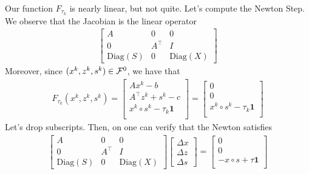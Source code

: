 	Our function $F_{\tau_k}$ is nearly linear, but not quite. Let's compute the Newton Step. We observe that the Jacobian is the linear operator
	\begin{eqnarray*}
	\begin{bmatrix}
	A & 0 & 0 \\
	0 & A^\top & I \\
	\mathrm{Diag}(S) & 0 & \mathrm{Diag}(X)
	\end{bmatrix}
	\end{eqnarray*}
	Moreover, since $(x^k,z^k,s^k) \in {\cal F}^0$, we have that
	\begin{eqnarray*}
	F_{\tau_k}(x^k,z^k,s^k) = \begin{bmatrix} Ax^k - b \\
		A^\top z^k + s^k - c \\
		x^k \circ s^k - \tau_{k} \mathbf{1} \\
		\end{bmatrix} = \begin{bmatrix} 0 \\
		0 \\
		x^k \circ s^k - \tau_{k} \mathbf{1} \\
		\end{bmatrix}
	\end{eqnarray*}
	Let's drop subscripts. Then, on one can verify that the Newton satisfies
	\begin{eqnarray*}
	\begin{bmatrix}
	A & 0 & 0 \\
	0 & A^\top & I \\
	\mathrm{Diag}(S) & 0 & \mathrm{Diag}(X)
	\end{bmatrix} \begin{bmatrix} \Delta x\\
	\Delta z\\
	\Delta s
	\end{bmatrix} = \begin{bmatrix} 0 \\
	0 \\
	- x \circ s + \tau \mathbf{1} \\
	\end{bmatrix}
	\end{eqnarray*}

